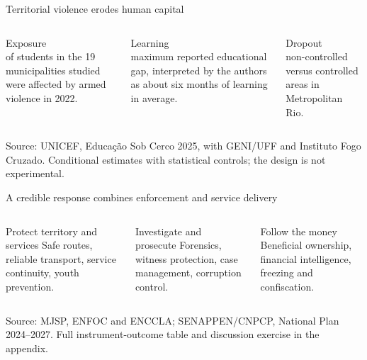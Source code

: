 \documentclass[10pt,aspectratio=169]{beamer}
\newcommand{\source}[1]{%
  \par\vfill{\tiny\color{MidGray}Source: #1}}
\begin{document}
\begin{frame}{Territorial violence erodes human capital}
  \begin{columns}[T,onlytextwidth]
      \begin{block}{Exposure}
        \\
        of students in the 19 municipalities studied were affected by armed violence in 2022.
      \end{block}
      \begin{block}{Learning}
        \\
        maximum reported educational gap, interpreted by the authors as about six months of learning in average.
      \end{block}
      \begin{block}{Dropout}
        \\
        non-controlled versus controlled areas in Metropolitan Rio.
      \end{block}
  \end{columns}
  \vspace{.35cm}
  \source{UNICEF, Educação Sob Cerco 2025, with GENI/UFF and Instituto Fogo Cruzado. Conditional estimates with statistical controls; the design is not experimental.}
\end{frame}

\begin{frame}{A credible response combines enforcement and service delivery}
  \begin{columns}[T,onlytextwidth]
      \begin{block}{Protect territory and services}
        Safe routes, reliable transport, service continuity, youth prevention.\\[.2cm]
      \end{block}
      \begin{block}{Investigate and prosecute}
        Forensics, witness protection, case management, corruption control.\\[.2cm]
      \end{block}
      \begin{block}{Follow the money}
        Beneficial ownership, financial intelligence, freezing and confiscation.\\[.2cm]
      \end{block}
  \end{columns}
  \source{MJSP, ENFOC and ENCCLA; SENAPPEN/CNPCP, National Plan 2024--2027. Full instrument-outcome table and discussion exercise in the appendix.}
\end{frame}
\end{document}
